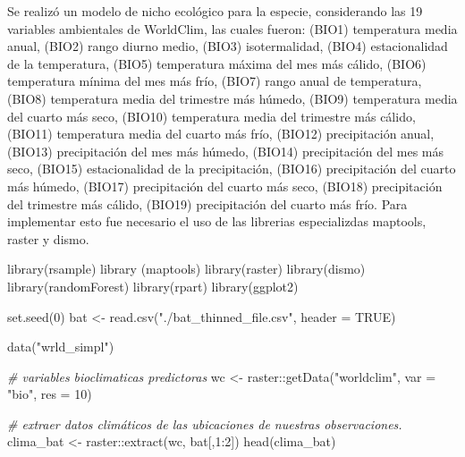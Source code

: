 \documentclass[
]{article}
\newenvironment{Shaded}{\begin{snugshade}}{\end{snugshade}}
\newcommand{\AttributeTok}[1]{\textcolor[rgb]{0.77,0.63,0.00}{#1}}
\newcommand{\CommentTok}[1]{\textcolor[rgb]{0.56,0.35,0.01}{\textit{#1}}}
\newcommand{\ConstantTok}[1]{\textcolor[rgb]{0.00,0.00,0.00}{#1}}
\newcommand{\DecValTok}[1]{\textcolor[rgb]{0.00,0.00,0.81}{#1}}
\newcommand{\FunctionTok}[1]{\textcolor[rgb]{0.00,0.00,0.00}{#1}}
\newcommand{\NormalTok}[1]{#1}
\newcommand{\OtherTok}[1]{\textcolor[rgb]{0.56,0.35,0.01}{#1}}
\newcommand{\SpecialCharTok}[1]{\textcolor[rgb]{0.00,0.00,0.00}{#1}}
\newcommand{\StringTok}[1]{\textcolor[rgb]{0.31,0.60,0.02}{#1}}
\begin{document}
Se realizó un modelo de nicho ecológico para la especie, considerando
las 19 variables ambientales de WorldClim, las cuales fueron: (BIO1)
temperatura media anual, (BIO2) rango diurno medio, (BIO3)
isotermalidad, (BIO4) estacionalidad de la temperatura, (BIO5)
temperatura máxima del mes más cálido, (BIO6) temperatura mínima del mes
más frío, (BIO7) rango anual de temperatura, (BIO8) temperatura media
del trimestre más húmedo, (BIO9) temperatura media del cuarto más seco,
(BIO10) temperatura media del trimestre más cálido, (BIO11) temperatura
media del cuarto más frío, (BIO12) precipitación anual, (BIO13)
precipitación del mes más húmedo, (BIO14) precipitación del mes más
seco, (BIO15) estacionalidad de la precipitación, (BIO16) precipitación
del cuarto más húmedo, (BIO17) precipitación del cuarto más seco,
(BIO18) precipitación del trimestre más cálido, (BIO19) precipitación
del cuarto más frío. Para implementar esto fue necesario el uso de las
librerias especializdas maptools, raster y dismo.

\begin{Shaded}
\begin{Highlighting}[]
\FunctionTok{library}\NormalTok{(rsample)}
\FunctionTok{library}\NormalTok{ (maptools)}
\FunctionTok{library}\NormalTok{(raster)}
\FunctionTok{library}\NormalTok{(dismo)}
\FunctionTok{library}\NormalTok{(randomForest)}
\FunctionTok{library}\NormalTok{(rpart)}
\FunctionTok{library}\NormalTok{(ggplot2)}

\FunctionTok{set.seed}\NormalTok{(}\DecValTok{0}\NormalTok{)}
\NormalTok{bat }\OtherTok{\textless{}{-}} \FunctionTok{read.csv}\NormalTok{(}\StringTok{"./bat\_thinned\_file.csv"}\NormalTok{, }\AttributeTok{header =} \ConstantTok{TRUE}\NormalTok{)}

\FunctionTok{data}\NormalTok{(}\StringTok{"wrld\_simpl"}\NormalTok{)}

\CommentTok{\# variables  bioclimaticas predictoras  }
\NormalTok{wc }\OtherTok{\textless{}{-}}\NormalTok{ raster}\SpecialCharTok{::}\FunctionTok{getData}\NormalTok{(}\StringTok{"worldclim"}\NormalTok{, }\AttributeTok{var =} \StringTok{"bio"}\NormalTok{, }\AttributeTok{res =} \DecValTok{10}\NormalTok{)}

\CommentTok{\# extraer datos climáticos de las ubicaciones de nuestras observaciones. }
\NormalTok{clima\_bat }\OtherTok{\textless{}{-}}\NormalTok{ raster}\SpecialCharTok{::}\FunctionTok{extract}\NormalTok{(wc, bat[,}\DecValTok{1}\SpecialCharTok{:}\DecValTok{2}\NormalTok{]) }
\FunctionTok{head}\NormalTok{(clima\_bat)}
\end{Highlighting}
\end{Shaded}
\end{document}
